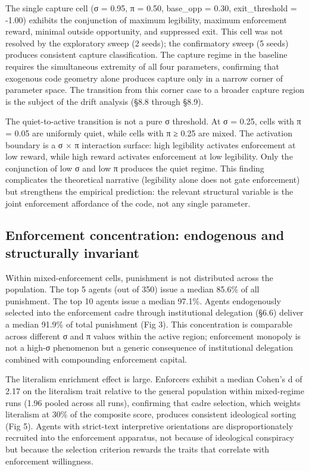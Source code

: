 \documentclass[12pt]{article}
\begin{document}
The single capture cell (σ = 0.95, π = 0.50, base\_opp = 0.30, exit\_threshold = -1.00) exhibits the conjunction of maximum legibility, maximum enforcement reward, minimal outside opportunity, and suppressed exit. This cell was not resolved by the exploratory sweep (2 seeds); the confirmatory sweep (5 seeds) produces consistent capture classification. The capture regime in the baseline requires the simultaneous extremity of all four parameters, confirming that exogenous code geometry alone produces capture only in a narrow corner of parameter space. The transition from this corner case to a broader capture region is the subject of the drift analysis (§8.8 through §8.9).

The quiet-to-active transition is not a pure σ threshold. At σ = 0.25, cells with π = 0.05 are uniformly quiet, while cells with π ≥ 0.25 are mixed. The activation boundary is a σ × π interaction surface: high legibility activates enforcement at low reward, while high reward activates enforcement at low legibility. Only the conjunction of low σ and low π produces the quiet regime. This finding complicates the theoretical narrative (legibility alone does not gate enforcement) but strengthens the empirical prediction: the relevant structural variable is the joint enforcement affordance of the code, not any single parameter.

%
\subsection{Enforcement concentration: endogenous and structurally invariant}

Within mixed-enforcement cells, punishment is not distributed across the population. The top 5 agents (out of 350) issue a median 85.6\% of all punishment. The top 10 agents issue a median 97.1\%. Agents endogenously selected into the enforcement cadre through institutional delegation (§6.6) deliver a median 91.9\% of total punishment (Fig 3). This concentration is comparable across different σ and π values within the active region; enforcement monopoly is not a high-σ phenomenon but a generic consequence of institutional delegation combined with compounding enforcement capital.

The literalism enrichment effect is large. Enforcers exhibit a median Cohen's d of 2.17 on the literalism trait relative to the general population within mixed-regime runs (1.96 pooled across all runs), confirming that cadre selection, which weights literalism at 30\% of the composite score, produces consistent ideological sorting (Fig 5). Agents with strict-text interpretive orientations are disproportionately recruited into the enforcement apparatus, not because of ideological conspiracy but because the selection criterion rewards the traits that correlate with enforcement willingness.
\end{document}
